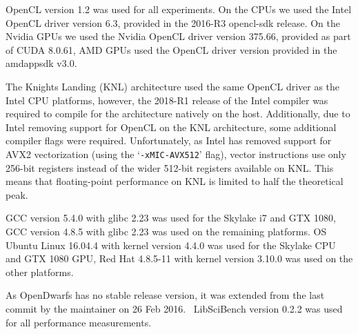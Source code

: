 \documentclass[../document.tex]{subfiles}
\begin{document}
\label{ssec:software}

OpenCL version 1.2 was used for all experiments.
On the CPUs we used the Intel OpenCL driver version 6.3, provided in the 2016-R3 opencl-sdk release.
On the Nvidia GPUs we used the Nvidia OpenCL driver version 375.66, provided as part of CUDA 8.0.61, AMD GPUs used the OpenCL driver version provided in the amdappsdk v3.0.

The Knights Landing (KNL) architecture used the same OpenCL driver as the Intel CPU platforms, however, the 2018-R1 release of the Intel compiler was required to compile for the architecture natively on the host.
Additionally, due to Intel removing support for OpenCL on the KNL architecture, some additional compiler flags were required.
Unfortunately, as Intel has removed support for AVX2 vectorization (using the `{\tt -xMIC-AVX512}' flag), vector instructions use only 256-bit registers instead of the wider 512-bit registers available on KNL.
This means that floating-point performance on KNL is limited to half the theoretical peak.

GCC version 5.4.0 with glibc 2.23 was used for the Skylake i7 and GTX 1080,  
GCC version 4.8.5 with glibc 2.23 was used on the remaining platforms.
OS Ubuntu Linux 16.04.4 with kernel version 4.4.0 was used for the Skylake CPU and GTX 1080 GPU, Red Hat 4.8.5-11 with kernel version 3.10.0 was used on the other platforms.

As OpenDwarfs has no stable release version, it was extended from the last commit by the maintainer on 26 Feb 2016.~\cite{opendwarfs2017base}
LibSciBench version 0.2.2 was used for all performance measurements.
\end{document}
